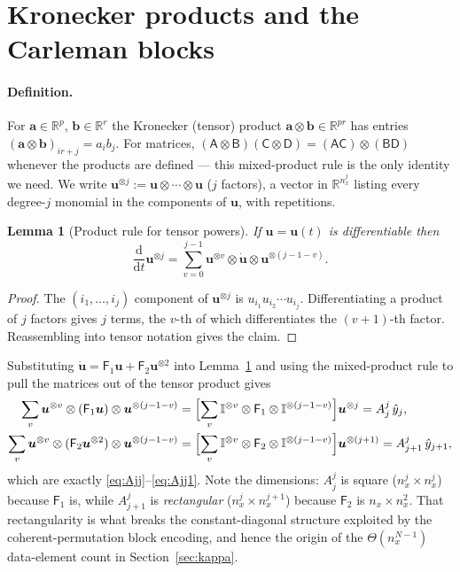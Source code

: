\documentclass[11pt,a4paper]{article}
\theoremstyle{plain}
\newtheorem{lemma}[proposition]{Lemma}
\theoremstyle{definition}
\theoremstyle{remark}
\newcommand{\R}{\mathbb{R}}
\newcommand{\dd}{\mathrm{d}}
\newcommand{\Id}{\mathbb{I}}
\newcommand{\uvec}{\bm{u}}
\newcommand{\Fone}{\mathsf{F}_1}
\newcommand{\Ftwo}{\mathsf{F}_2}
\begin{document}
\section{Kronecker products and the Carleman blocks}
\label{app:kron}

\paragraph{Definition.}  For $\bm a\in\R^{p}$, $\bm b\in\R^{r}$ the Kronecker
(tensor) product $\bm a\otimes\bm b\in\R^{pr}$ has entries
$(\bm a\otimes\bm b)_{ir+j}=a_ib_j$.  For matrices,
$(\mathsf{A}\otimes \mathsf{B})(\mathsf{C}\otimes \mathsf{D})
=(\mathsf{AC})\otimes(\mathsf{BD})$ whenever the products are defined --- this
mixed-product rule is the only identity we need.  We write
$\uvec^{\otimes j}:=\uvec\otimes\cdots\otimes\uvec$ ($j$ factors), a vector in
$\R^{n_x^j}$ listing every degree-$j$ monomial in the components of $\uvec$,
with repetitions.

\begin{lemma}[Product rule for tensor powers]
\label{lem:prodrule}
If $\uvec=\uvec(t)$ is differentiable then
\begin{equation}
\frac{\dd}{\dd t}\uvec^{\otimes j}
=\sum_{v=0}^{j-1}\uvec^{\otimes v}\otimes\dot{\uvec}\otimes\uvec^{\otimes(j-1-v)}.
\end{equation}
\end{lemma}
\begin{proof}
The $(i_1,\dots,i_j)$ component of $\uvec^{\otimes j}$ is
$u_{i_1}u_{i_2}\cdots u_{i_j}$.  Differentiating a product of $j$ factors gives
$j$ terms, the $v$-th of which differentiates the $(v{+}1)$-th factor.
Reassembling into tensor notation gives the claim.
\end{proof}

Substituting $\dot{\uvec}=\Fone\uvec+\Ftwo\uvec^{\otimes2}$ into
Lemma~\ref{lem:prodrule} and using the mixed-product rule to pull the matrices
out of the tensor product gives
\begin{align}
\sum_{v}\uvec^{\otimes v}\otimes(\Fone\uvec)\otimes\uvec^{\otimes(j-1-v)}
&=\Bigl[\sum_v\Id^{\otimes v}\otimes\Fone\otimes\Id^{\otimes(j-1-v)}\Bigr]\uvec^{\otimes j}
=A^j_j\,\hat y_j,\\
\sum_{v}\uvec^{\otimes v}\otimes(\Ftwo\uvec^{\otimes2})\otimes\uvec^{\otimes(j-1-v)}
&=\Bigl[\sum_v\Id^{\otimes v}\otimes\Ftwo\otimes\Id^{\otimes(j-1-v)}\Bigr]\uvec^{\otimes(j+1)}
=A^j_{j+1}\,\hat y_{j+1},
\end{align}
which are exactly \eqref{eq:Ajj}--\eqref{eq:Ajj1}.  Note the dimensions:
$A^j_j$ is square ($n_x^j\times n_x^j$) because $\Fone$ is, while $A^j_{j+1}$ is
\emph{rectangular} ($n_x^j\times n_x^{j+1}$) because $\Ftwo$ is
$n_x\times n_x^2$.  That rectangularity is what breaks the constant-diagonal
structure exploited by the coherent-permutation block encoding, and hence the
origin of the $\Theta(n_x^{N-1})$ data-element count in
Section~\ref{sec:kappa}.
\end{document}
